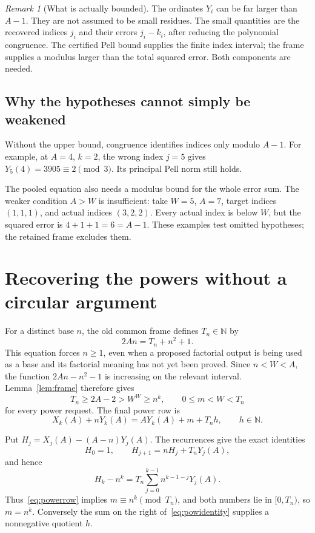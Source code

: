 \documentclass[11pt]{article}
\theoremstyle{definition}\newtheorem{definition}[theorem]{Definition}
\theoremstyle{remark}\newtheorem{remark}[theorem]{Remark}
\newcommand{\N}{\mathbb N}\newcommand{\Z}{\mathbb Z}
\begin{document}
\begin{remark}[What is actually bounded]
The ordinates $Y_i$ can be far larger than $A-1$. They are not assumed to be small residues. The small quantities are the recovered indices $j_i$ and their errors $j_i-k_i$, after reducing the polynomial congruence. The certified Pell bound supplies the finite index interval; the frame supplies a modulus larger than the total squared error. Both components are needed.
\end{remark}

\subsection{Why the hypotheses cannot simply be weakened}

Without the upper bound, congruence identifies indices only modulo $A-1$. For example, at $A=4$, $k=2$, the wrong index $j=5$ gives $Y_5(4)=3905\equiv2\pmod3$. Its principal Pell norm still holds.

The pooled equation also needs a modulus bound for the whole error sum. The weaker condition $A>W$ is insufficient: take $W=5$, $A=7$, target indices $(1,1,1)$, and actual indices $(3,2,2)$. Every actual index is below $W$, but the squared error is $4+1+1=6=A-1$. These examples test omitted hypotheses; the retained frame excludes them.

\section{Recovering the powers without a circular argument}

For a distinct base $n$, the old common frame defines $T_n\in\N$ by
\begin{equation}\label{eq:Tn}
 2An=T_n+n^2+1.
\end{equation}
This equation forces $n\ge1$, even when a proposed factorial output is being used as a base and its factorial meaning has not yet been proved. Since $n<W<A$, the function $2An-n^2-1$ is increasing on the relevant interval. Lemma~\ref{lem:frame} therefore gives
\[
 T_n\ge2A-2>W^W\ge n^k,
 \qquad 0\le m<W<T_n
\]
for every power request. The final power row is
\begin{equation}\label{eq:powerrow}
 X_k(A)+nY_k(A)=AY_k(A)+m+T_nh,\qquad h\in\N.
\end{equation}

Put $H_j=X_j(A)-(A-n)Y_j(A)$. The recurrences give the exact identities
\[
 H_0=1,\qquad H_{j+1}=nH_j+T_nY_j(A),
\]
and hence
\begin{equation}\label{eq:powidentity}
 H_k-n^k=T_n\sum_{j=0}^{k-1}n^{k-1-j}Y_j(A).
\end{equation}
Thus~\eqref{eq:powerrow} implies $m\equiv n^k\pmod{T_n}$, and both numbers lie in $[0,T_n)$, so $m=n^k$. Conversely the sum on the right of~\eqref{eq:powidentity} supplies a nonnegative quotient $h$.
\end{document}
